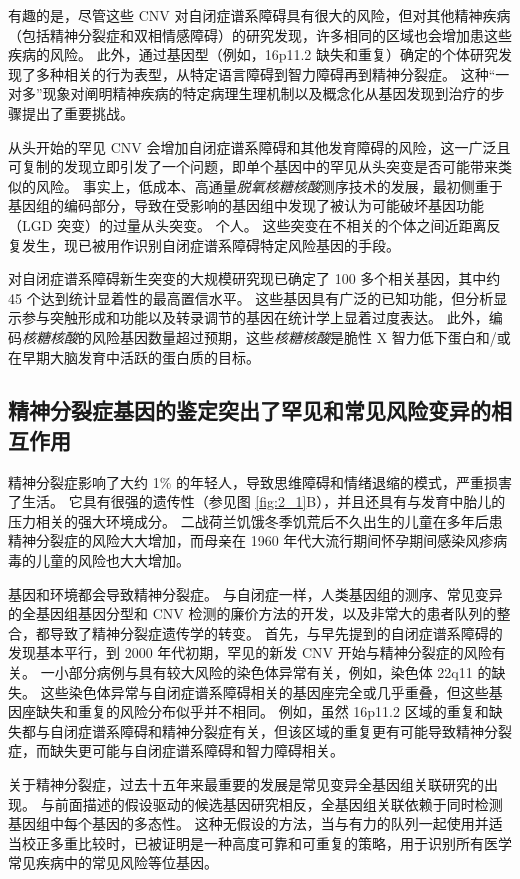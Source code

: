 有趣的是，尽管这些 CNV 对自闭症谱系障碍具有很大的风险，但对其他精神疾病（包括精神分裂症和双相情感障碍）的研究发现，许多相同的区域也会增加患这些疾病的风险。 
此外，通过基因型（例如，16p11.2 缺失和重复）确定的个体研究发现了多种相关的行为表型，从特定语言障碍到智力障碍再到精神分裂症。 
这种“一对多”现象对阐明精神疾病的特定病理生理机制以及概念化从基因发现到治疗的步骤提出了重要挑战。


从头开始的罕见 CNV 会增加自闭症谱系障碍和其他发育障碍的风险，这一广泛且可复制的发现立即引发了一个问题，即单个基因中的罕见从头突变是否可能带来类似的风险。 
事实上，低成本、高通量\textit{脱氧核糖核酸}测序技术的发展，最初侧重于基因组的编码部分，导致在受影响的基因组中发现了被认为可能破坏基因功能（LGD 突变）的过量从头突变。 
个人。 这些突变在不相关的个体之间近距离反复发生，现已被用作识别自闭症谱系障碍特定风险基因的手段。


对自闭症谱系障碍新生突变的大规模研究现已确定了 100 多个相关基因，其中约 45 个达到统计显着性的最高置信水平。 
这些基因具有广泛的已知功能，但分析显示参与突触形成和功能以及转录调节的基因在统计学上显着过度表达。 
此外，编码\textit{核糖核酸}的风险基因数量超过预期，这些\textit{核糖核酸}是脆性 X 智力低下蛋白和/或在早期大脑发育中活跃的蛋白质的目标。


\subsection{精神分裂症基因的鉴定突出了罕见和常见风险变异的相互作用}

精神分裂症影响了大约 1\% 的年轻人，导致思维障碍和情绪退缩的模式，严重损害了生活。 
它具有很强的遗传性（参见图 \ref{fig:2_1}B），并且还具有与发育中胎儿的压力相关的强大环境成分。 
二战荷兰饥饿冬季饥荒后不久出生的儿童在多年后患精神分裂症的风险大大增加，而母亲在 1960 年代大流行期间怀孕期间感染风疹病毒的儿童的风险也大大增加。


基因和环境都会导致精神分裂症。 
与自闭症一样，人类基因组的测序、常见变异的全基因组基因分型和 CNV 检测的廉价方法的开发，以及非常大的患者队列的整合，都导致了精神分裂症遗传学的转变。 
首先，与早先提到的自闭症谱系障碍的发现基本平行，到 2000 年代初期，罕见的新发 CNV 开始与精神分裂症的风险有关。 
一小部分病例与具有较大风险的染色体异常有关，例如，染色体 22q11 的缺失。 
这些染色体异常与自闭症谱系障碍相关的基因座完全或几乎重叠，但这些基因座缺失和重复的风险分布似乎并不相同。 
例如，虽然 16p11.2 区域的重复和缺失都与自闭症谱系障碍和精神分裂症有关，但该区域的重复更有可能导致精神分裂症，而缺失更可能与自闭症谱系障碍和智力障碍相关。


关于精神分裂症，过去十五年来最重要的发展是常见变异全基因组关联研究的出现。 
与前面描述的假设驱动的候选基因研究相反，全基因组关联依赖于同时检测基因组中每个基因的多态性。 
这种无假设的方法，当与有力的队列一起使用并适当校正多重比较时，已被证明是一种高度可靠和可重复的策略，用于识别所有医学常见疾病中的常见风险等位基因。


